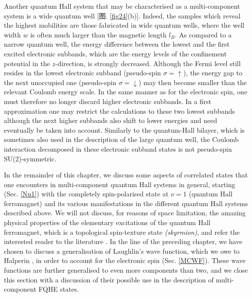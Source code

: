 \documentclass[10pt]{book}
\newcommand{\red}{\color{red}}
\newcommand{\ua}{\uparrow}
\newcommand{\da}{\downarrow}
\begin{document}
Another quantum Hall system that may be characterised as a multi-component system is a wide quantum well [图. \ref{fig24}(b)]. 
Indeed, the 
samples which reveal the highest mobilities are those fabricated in wide quantum wells, where the well width $w$ is often
much larger than the magnetic length $l_B$. As compared to a narrow quantum well, the energy difference between the lowest 
and the first excited electronic subbands, which are the energy levels of the confinement potential in the $z$-direction, 
is strongly decreased. Although the Fermi level still resides in the lowest electronic subband (pseudo-spin $\sigma=\ua$), 
the energy gap to the next unoccupied one (pseudo-spin $\sigma=\da$) may then become smaller than the relevant Coulomb energy
scale. In the same manner as for the electronic spin, one must therefore no longer discard higher electronic subbands. In 
a first approximation one may restrict the calculations to these two lowest subbands \cite{albofath,papic}
although the next higher subbands also shift to lower energies and need eventually be taken into account. Similarly to 
the quantum-Hall bilayer, which is sometimes also used in the description of the large quantum well, the Coulomb interaction 
decomposed in these electronic subband states is not pseudo-spin SU(2)-symmetric.


\vspace*{0.5cm}

In the remainder of this chapter, we discuss some aspects of correlated states that one encounters in multi-component
quantum Hall systems in general, starting (Sec. \ref{Nu1}) 
with the completely spin-polarised state at $\nu=1$ (quantum Hall ferromagnet)
and its various manifestations in the different quantum Hall systems described above. We will not discuss, for 
reasons of space limitation, the amazing physical properties of the elementary excitations of the quantum Hall ferromagnet,
which is a topological spin-texture state {\sl (skyrmion)}, and refer the interested reader to the literature 
\cite{sondhi,moon,GirvinLH,ezawa}. In the line of the preceding chapter, we have chosen to discuss a generalisation of Laughlin's
wave function, which we owe to Halperin \cite{halperin83}, in order to account for the electronic spin (Sec. \ref{MCWF}).
These wave functions are further generalised to even more components than two, and we close this section with a discussion of their
possible use in the description of multi-component FQHE states.
\end{document}
